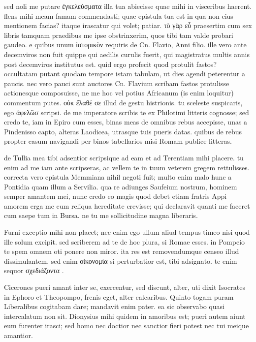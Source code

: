  sed noli me putare ἐγκελεύσματα illa tua abiecisse quae mihi in visceribus haerent. flens mihi meam famam commendasti; quae epistula tua est in qua non eius mentionem facias? itaque irascatur qui volet; patiar. τὸ γὰρ εὖ praesertim cum sex libris tamquam praedibus me ipse obstrinxerim, quos tibi tam valde probari gaudeo. e quibus unum ἱστορικὸν requiris de Cn. Flavio, Anni filio. ille vero ante decemviros non fuit quippe qui aedilis curulis fuerit, qui magistratus multis annis post decemviros institutus est. quid ergo profecit quod protulit fastos? occultatam putant quodam tempore istam tabulam, ut dies agendi peterentur a paucis. nec vero pauci sunt auctores Cn. Flavium scribam fastos protulisse actionesque composuisse, ne me hoc vel potius Africanum (is enim loquitur) commentum putes. οὐκ ἔλαθέ σε illud de gestu histrionis. tu sceleste suspicaris, ego ἀφελῶσ scripsi. de me imperatore scribis te ex Philotimi litteris cognosse; sed credo te, iam in Epiro cum esses, binas meas de omnibus rebus accepisse, unas a Pindenisso capto, alteras Laodicea, utrasque tuis pueris datas. quibus de rebus propter casum navigandi per binos tabellarios misi Romam publice litteras.

 de Tullia mea tibi adsentior scripsique ad eam et ad Terentiam mihi placere. tu enim ad me iam ante scripseras, ac vellem te in tuum veterem gregem rettulisses. correcta vero epistula Memmiana nihil negoti fuit; multo enim malo hunc a Pontidia quam illum a Servilia. qua re adiunges Saufeium nostrum, hominem semper amantem mei, nunc credo eo magis quod debet etiam fratris Appi amorem erga me cum reliqua hereditate crevisse; qui declaravit quanti me faceret cum saepe tum in Bursa. ne tu me sollicitudine magna liberaris.

 Furni exceptio mihi non placet; nec enim ego ullum aliud tempus timeo nisi quod ille solum excipit. sed scriberem ad te de hoc plura, si Romae esses. in Pompeio te spem omnem oti ponere non miror. ita res est removendumque censeo illud dissimulantem. sed enim οἰκονομία si perturbatior est, tibi adsignato. te enim sequor σχεδιάζοντα .

 Cicerones pueri amant inter se, exercentur, sed discunt, alter, uti dixit Isocrates in Ephoro et Theopompo, frenis eget, alter calcaribus. Quinto togam puram Liberalibus cogitabam dare; mandavit enim pater. ea sic observabo quasi intercalatum non sit. Dionysius mihi quidem in amoribus est; pueri autem aiunt eum furenter irasci; sed homo nec doctior nec sanctior fieri potest nec tui meique amantior.

